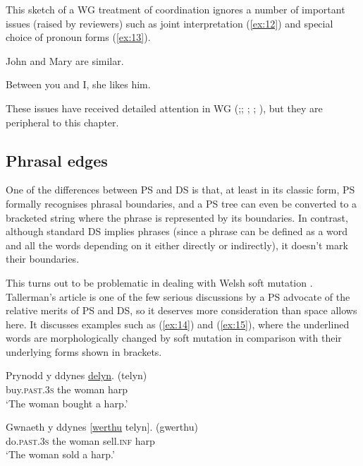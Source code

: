 \documentclass[output=paper]{langscibook}
\begin{document}
This sketch of a WG treatment of coordination ignores a number of important issues (raised by reviewers) such as joint interpretation (\ref{ex:12}) and special choice of pronoun forms (\ref{ex:13}).

\begin{exe}
	\ex \label{ex:12} John and Mary are similar.

	\ex \label{ex:13} Between you and I, she likes him.
\end{exe}

These issues have received detailed attention in WG (\citealt[Chapter~5]{Hudson84a-u};\citeyear{Hudson88a}; \citeyear[Chapter~14]{Hudson90a-u}; \citeyear{Hudson1995}; \citeyear[175--181, 304--307]{Hudson2010b-u}), but they are peripheral to this chapter.


\subsection{Phrasal edges}
\label{sec:4.3}

One of the differences between PS and DS is that, at least in its classic form, PS formally recognises phrasal boundaries, and a PS tree can even be converted to a bracketed string where the phrase is represented by its boundaries. In contrast, although standard DS implies phrases (since a phrase can be defined as a word and all the words depending on it either directly or indirectly), it doesn’t mark their boundaries.

This turns out to be problematic in dealing with Welsh soft mutation \citep{Tallerman2009}. Tallerman’s article is one of the few serious discussions by a PS advocate of the relative merits of PS and DS, so it deserves more consideration than space allows here. It discusses examples such as (\ref{ex:14}) and (\ref{ex:15}), where the underlined words are morphologically changed by soft mutation in comparison with their underlying forms shown in brackets.

\begin{exe}
	\ex \label{ex:14}
	\gll Prynodd y ddynes \underline{delyn}. (telyn)\\
	buy.\textsc{past}.3\textsc{s} the woman harp\\
	\glt ‘The woman bought a harp.’

	\ex \label{ex:15}
	\gll Gwnaeth y ddynes [\underline{werthu} telyn]. (gwerthu)\\
	do.\textsc{past}.3\textsc{s} the woman sell.\textsc{inf} harp\\
	\glt ‘The woman sold a harp.’
\end{exe}
\end{document}
